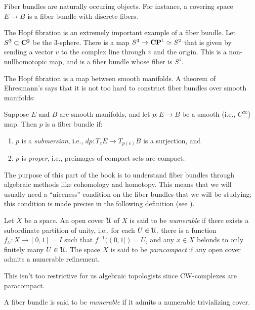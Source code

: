 Fiber bundles are naturally occuring objects.
For instance, a covering space $E\to B$ is a fiber bundle with discrete fibers. 
\begin{example}
    The Hopf fibration is an extremely important example of a fiber bundle.
    Let $S^3\subset \mathbf C^2$ be the $3$-sphere.
    There is a map $S^3\to \mathbf{CP}^1 \simeq S^2$ that is given by sending a vector $v$ to the
    complex line through $v$ and the origin.
    This is a non-nullhomotopic map, and is a fiber bundle whose fiber is $S^1$.
\end{example}
The Hopf fibration is a map between smooth manifolds.
A theorem of Ehresmann's says that it is not too hard to construct fiber bundles over smooth manifolds:
\begin{theorem}[Ehresmann]
    Suppose $E$ and $B$ are smooth manifolds, and let $p:E\to B$ be a smooth (i.e., $C^\infty$) map.
    Then $p$ is a fiber bundle if:
    \begin{enumerate}
	\item $p$ is a \emph{submersion}, i.e., $dp:T_e E\to T_{p(e)} B$ is a surjection, and
	\item $p$ is \emph{proper}, i.e., preimages of compact sets are compact.
    \end{enumerate}
\end{theorem}
The purpose of this part of the book is to understand fiber bundles through algebraic methods like cohomology and homotopy.
This means that we will usually need a ``niceness'' condition on the fiber bundles that we will be studying;
this condition is made precise in the following definition (see \cite{MayConcise}).
\begin{definition}
    Let $X$ be a space.
    An open cover $\mathcal U$ of $X$ is said to be \emph{numerable}
    if there exists a subordinate partition of unity, i.e.,
    for each $U\in\mathcal U$, there is a function $f_U:X\to [0,1]=I$
    such that $f^{-1}((0,1]) = U$,
    and any $x\in X$ belonds to only finitely many $U\in\mathcal U$.
    The space $X$ is said to be \emph{paracompact} if any open cover admits a numerable refinement.
\end{definition}
This isn't too restrictive for us algebraic topologists since CW-complexes are paracompact.
\begin{definition}
    A fiber bundle is said to be \emph{numerable} if it admits a numerable trivializing cover.
\end{definition}

